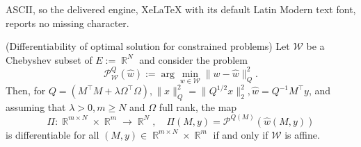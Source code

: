\documentclass[10pt,a4paper]{amsart}
\DeclareMathOperator{\R}{\mathbb{R}}
\begin{document}
ASCII, so the delivered engine, XeLaTeX with its default Latin Modern text font, reports no missing character.
\begin{Proposition}(Differentiability of optimal solution for constrained problems)\label{prop:differentiability_optimalconstrained} 
Let $\mathscr W$ be a Chebyshev subset of $E:=\R^N$ and consider the problem
    \[
    \mathcal P_{\mathscr W}^{Q}(\widehat w):= \arg\min_{w \in \mathscr W} \|w-\widehat w \|_{Q}^2.
    \]
Then, for $Q = (M^\top M + \lambda \Omega^\top  \Omega), \| x\|_Q^2 = \|Q^{1/2}x \|_2^2, \widehat w = Q^{-1} M^\top y$, and assuming that $\lambda > 0, m \geq N$ and $\Omega$ full rank, the map 
\[
\Pi : \R^{m \times N} \times \R^{m} \to \R^{N},\quad  \Pi(M,y) = \mathcal P^{Q(M)}(\widehat w(M,y))
\]
is differentiable for all $(M,y) \in \R^{m \times N} \times \R^{m}$ if and only if $\mathscr W$ is affine.
\end{Proposition}
\end{document}
